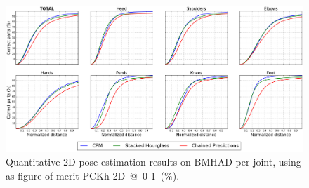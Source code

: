 \begin{figure}[h]
    \centering
    \includegraphics[width=\textwidth]{figures/pckh_2d.png}
    \caption{Quantitative 2D pose estimation results on BMHAD per joint, using as figure of merit PCKh 2D~@~0-1~(\%). }
    \label{fig:pckh_2d}
\end{figure}

\begin{table}[!ht]  
  \centering
  \caption{Quantitative 2D pose estimation results on BMHAD per joint, using as figure of merit PCKh~2D~@~1~(\%). Values in bold correspond to the best results achieved for each category.}
  \label{tab:pckh_2d}
\end{table}

